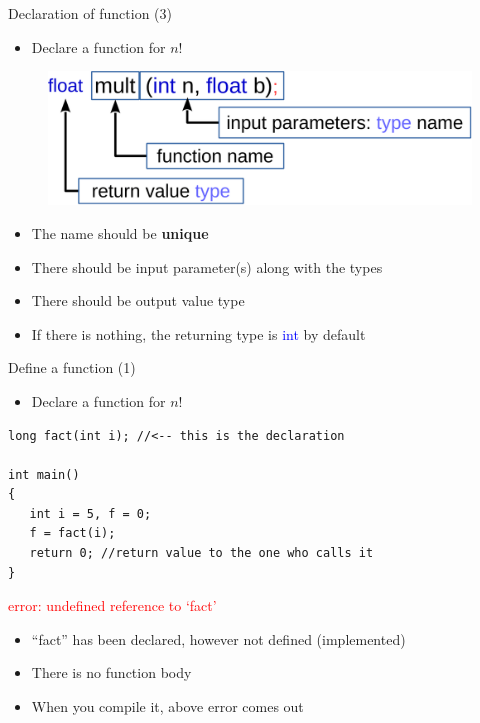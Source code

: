 \begin{frame}[fragile]{Declaration of function (3)}
\begin{itemize}
	\item {Declare a function for $n!$}
\end{itemize}
\begin{figure}
	\includegraphics[width=0.8\linewidth]{figs/func_declar2.pdf}
\end{figure}
\vspace{-0.15in}
\begin{itemize}
	\item {The name should be \textbf{unique}}
	\item {There should be input parameter(s) along with the types}
	\item {There should be output value type}
	\item {If there is nothing, the returning type is \textcolor{blue}{int} by default}
\end{itemize}
\end{frame}

\begin{frame}[fragile]{Define a function (1)}
\begin{itemize}
	\item {Declare a function for $n!$}
\end{itemize}
\begin{lstlisting}
long fact(int i); //<-- this is the declaration

int main()
{
   int i = 5, f = 0;
   f = fact(i);
   return 0; //return value to the one who calls it
}
\end{lstlisting}
\vspace{-0.15in}
\begin{center}
    \Large{
	\textcolor{red}{error: undefined reference to `fact'}}
\end{center}
\begin{itemize}
	\item {``fact'' has been declared, however not defined (implemented)}
	\item {There is no function body}
	\item {When you compile it, above error comes out}
\end{itemize}

\end{frame}

